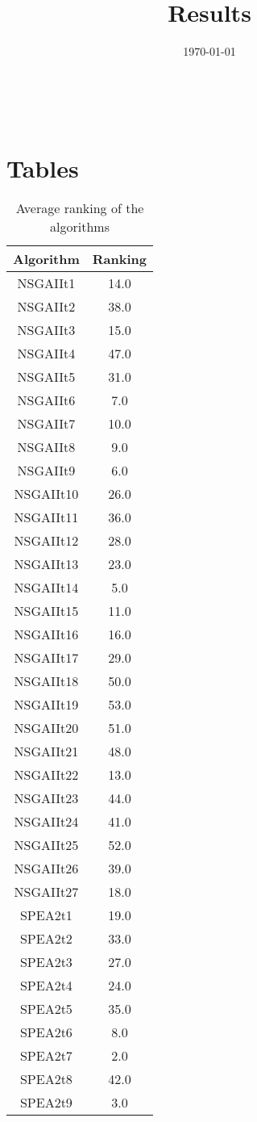 \documentclass{article}
\title{Results}
\author{}
\date{\today}
\begin{document}
\oddsidemargin 0in \topmargin 0in\maketitle
\
\section{Tables}
\begin{table}[!htp]
\centering
\caption{Average ranking of the algorithms}
\begin{tabular}{c|c}
Algorithm&Ranking\\
\hline
NSGAIIt1&14.0\\
NSGAIIt2&38.0\\
NSGAIIt3&15.0\\
NSGAIIt4&47.0\\
NSGAIIt5&31.0\\
NSGAIIt6&7.0\\
NSGAIIt7&10.0\\
NSGAIIt8&9.0\\
NSGAIIt9&6.0\\
NSGAIIt10&26.0\\
NSGAIIt11&36.0\\
NSGAIIt12&28.0\\
NSGAIIt13&23.0\\
NSGAIIt14&5.0\\
NSGAIIt15&11.0\\
NSGAIIt16&16.0\\
NSGAIIt17&29.0\\
NSGAIIt18&50.0\\
NSGAIIt19&53.0\\
NSGAIIt20&51.0\\
NSGAIIt21&48.0\\
NSGAIIt22&13.0\\
NSGAIIt23&44.0\\
NSGAIIt24&41.0\\
NSGAIIt25&52.0\\
NSGAIIt26&39.0\\
NSGAIIt27&18.0\\
SPEA2t1&19.0\\
SPEA2t2&33.0\\
SPEA2t3&27.0\\
SPEA2t4&24.0\\
SPEA2t5&35.0\\
SPEA2t6&8.0\\
SPEA2t7&2.0\\
SPEA2t8&42.0\\
SPEA2t9&3.0\\

\end{tabular}
\end{table}
\end{document}
